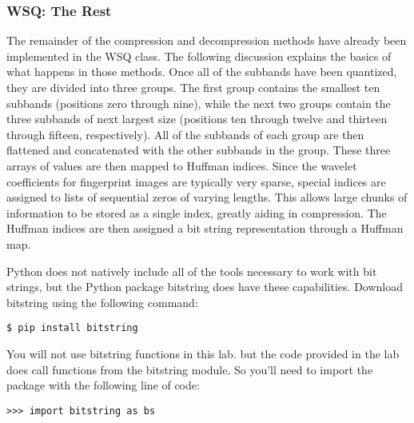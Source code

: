 \subsubsection*{WSQ: The Rest}
The remainder of the compression and decompression methods have already been implemented in the WSQ class.
The following discussion explains the basics of what happens in those methods.
Once all of the subbands have been quantized, they are divided into three groups.
The first group contains the smallest ten subbands (positions zero through nine), while the next two groups contain the three subbands of next largest size (positions ten through twelve and
thirteen through fifteen, respectively).
All of the subbands of each group are then flattened and concatenated with the other subbands in the group.
These three arrays of values are then mapped to Huffman indices.
Since the wavelet coefficients for fingerprint images are typically very sparse, special indices are assigned to lists of sequential zeros of varying lengths.
This allows large chunks of information to be stored as a single index, greatly aiding in compression.
The Huffman indices are then assigned a bit string representation through a Huffman map.

Python does not natively include all of the tools necessary to work with bit strings, but the Python package bitstring does have these capabilities.
Download bitstring using the following command:
\begin{lstlisting}
$ pip install bitstring
\end{lstlisting}
You will not use bitstring functions in this lab. but the code provided in the lab does call functions from the bitstring module. So you'll need to import the package with the following line of code:
\begin{lstlisting}
>>> import bitstring as bs
\end{lstlisting}


